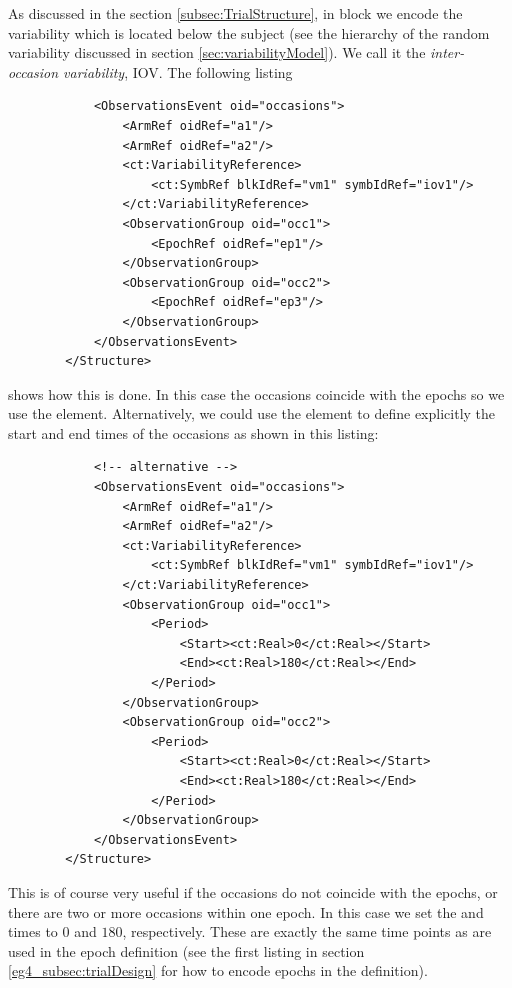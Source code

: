 As discussed in the section \ref{subsec:TrialStructure}, in  block 
we encode the variability which is located below the subject (see the 
hierarchy of the random variability discussed in section \ref{sec:variabilityModel}).
We call it the \textit{inter-occasion variability}, IOV. The following listing 
\lstset{language=XML}
\begin{lstlisting}
            <ObservationsEvent oid="occasions"> 
                <ArmRef oidRef="a1"/>
                <ArmRef oidRef="a2"/>
                <ct:VariabilityReference>
                    <ct:SymbRef blkIdRef="vm1" symbIdRef="iov1"/>
                </ct:VariabilityReference>
                <ObservationGroup oid="occ1">
                    <EpochRef oidRef="ep1"/>
                </ObservationGroup>
                <ObservationGroup oid="occ2">
                    <EpochRef oidRef="ep3"/>
                </ObservationGroup>
            </ObservationsEvent>
        </Structure>
\end{lstlisting}

shows how this is done. 
In this case the occasions coincide with the epochs 
so we use the  element. Alternatively, we could use the 
element to define explicitly the start and end times of the occasions as shown 
in this listing: 
\lstset{language=XML}
\begin{lstlisting}
            <!-- alternative -->
            <ObservationsEvent oid="occasions"> 
                <ArmRef oidRef="a1"/>
                <ArmRef oidRef="a2"/>
                <ct:VariabilityReference>
                    <ct:SymbRef blkIdRef="vm1" symbIdRef="iov1"/>
                </ct:VariabilityReference>
                <ObservationGroup oid="occ1">
                    <Period>
                        <Start><ct:Real>0</ct:Real></Start>
                        <End><ct:Real>180</ct:Real></End>
                    </Period>
                </ObservationGroup>
                <ObservationGroup oid="occ2">
                    <Period>
                        <Start><ct:Real>0</ct:Real></Start>
                        <End><ct:Real>180</ct:Real></End>
                    </Period>
                </ObservationGroup>
            </ObservationsEvent>
        </Structure>
\end{lstlisting}

This is of course very useful if the occasions do not
coincide with the epochs, or there are two or more occasions within one epoch.
In this case we set the  and  times to $0$ and $180$, respectively.
These are exactly the same time points as are used in the epoch definition 
(see the first listing in section \ref{eg4_subsec:trialDesign} for how to encode epochs in the 
 definition).   


